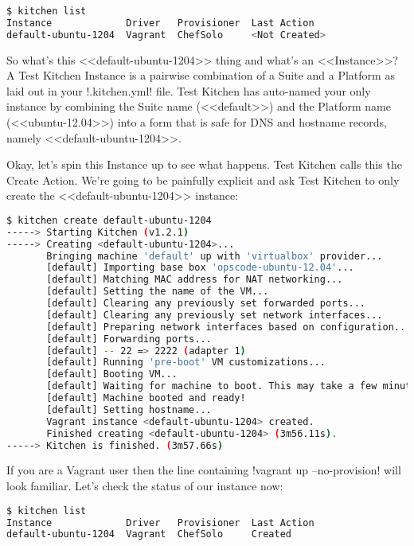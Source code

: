 \begin{lstlisting}[language=Bash,label=lst:testing-test-kitchen6]
$ kitchen list
Instance             Driver   Provisioner  Last Action
default-ubuntu-1204  Vagrant  ChefSolo     <Not Created>
\end{lstlisting}

So what's this <<default-ubuntu-1204>> thing and what's an <<Instance>>? A Test Kitchen Instance is a pairwise combination of a Suite and a Platform as laid out in your \inline!.kitchen.yml! file. Test Kitchen has auto-named your only instance by combining the Suite name (<<default>>) and the Platform name (<<ubuntu-12.04>>) into a form that is safe for DNS and hostname records, namely <<default-ubuntu-1204>>.

Okay, let's spin this Instance up to see what happens. Test Kitchen calls this the Create Action. We're going to be painfully explicit and ask Test Kitchen to only create the <<default-ubuntu-1204>> instance:

\begin{lstlisting}[language=Bash,label=lst:testing-test-kitchen7]
$ kitchen create default-ubuntu-1204
-----> Starting Kitchen (v1.2.1)
-----> Creating <default-ubuntu-1204>...
       Bringing machine 'default' up with 'virtualbox' provider...
       [default] Importing base box 'opscode-ubuntu-12.04'...
       [default] Matching MAC address for NAT networking...
       [default] Setting the name of the VM...
       [default] Clearing any previously set forwarded ports...
       [default] Clearing any previously set network interfaces...
       [default] Preparing network interfaces based on configuration...
       [default] Forwarding ports...
       [default] -- 22 => 2222 (adapter 1)
       [default] Running 'pre-boot' VM customizations...
       [default] Booting VM...
       [default] Waiting for machine to boot. This may take a few minutes...
       [default] Machine booted and ready!
       [default] Setting hostname...
       Vagrant instance <default-ubuntu-1204> created.
       Finished creating <default-ubuntu-1204> (3m56.11s).
-----> Kitchen is finished. (3m57.66s)
\end{lstlisting}

If you are a Vagrant user then the line containing \inline!vagrant up --no-provision! will look familiar. Let's check the status of our instance now:

\begin{lstlisting}[language=Bash,label=lst:testing-test-kitchen8]
$ kitchen list
Instance             Driver   Provisioner  Last Action
default-ubuntu-1204  Vagrant  ChefSolo     Created
\end{lstlisting}
